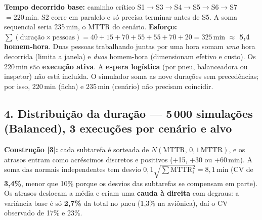 \documentclass[11pt,a4paper]{article}
\begin{document}
\textbf{Tempo decorrido base:} caminho crítico S1$\to$S3$\to$S4$\to$S5$\to$S6$\to$S7 $=220$\,min. S2 corre em paralelo e só precisa terminar antes de S5. A soma sequencial seria 235\,min, o MTTR do cenário.
\textbf{Esforço:} $\sum(\text{duração}\times\text{pessoas})=40+15+70+55+55+70+20=325$\,min $\approx$ \textbf{5,4 homem-hora}.
Duas pessoas trabalhando juntas por uma hora somam \emph{uma} hora decorrida (limita a janela) e \emph{duas} homem-hora (dimensionam efetivo e custo).
Os 220\,min são \textbf{execução ativa}. A \textbf{espera logística} (por pneu, balanceadora ou inspetor) não está incluída. O simulador soma as nove durações sem precedências; por isso, 220\,min (ficha) e 235\,min (cenário) não precisam coincidir.

\subsection*{4. Distribuição da duração --- 5\,000 simulações (Balanced), 3 execuções por cenário e alvo}
\textbf{Construção [3]:} cada subtarefa é sorteada de $N(\mathrm{MTTR},\,0{,}1\,\mathrm{MTTR})$, e os atrasos entram como acréscimos discretos e positivos (+15, +30 ou +60\,min).
A soma das normais independentes tem desvio $0{,}1\sqrt{\sum\mathrm{MTTR}_i^2}=8{,}1$\,min (CV de \textbf{3,4\%}, menor que 10\% porque os desvios das subtarefas se compensam em parte).
Os atrasos deslocam a média e criam uma \textbf{cauda à direita} com degraus: a variância base é só \textbf{2,7\%} da total no pneu (1,3\% na aviônica), daí o CV observado de 17\% e 23\%.
\end{document}
